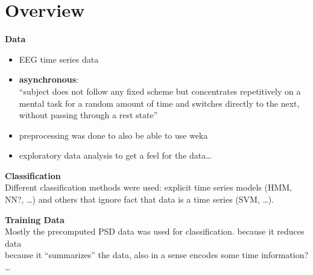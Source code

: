 
\section{Overview}

\textbf{Data}
\begin{itemize}
    \item EEG time series data
    \item \textbf{asynchronous}:\\
        ``subject does not follow any fixed scheme but concentrates repetitively on a mental task for a random amount of time
        and switches directly to the next, without passing through a rest state''
    \item preprocessing was done to also be able to use weka
    \item exploratory data analysis to get a feel for the data\ldots
\end{itemize}

\textbf{Classification}\\
Different classification methods were used: explicit time series models (HMM, NN?, \ldots) and others that ignore fact that data is a time series (SVM, \ldots).

\textbf{Training Data}\\
Mostly the precomputed PSD data was used for classification.
\arr because it reduces data\\
\arr because it ``summarizes'' the data, also in a sense encodes some time information?
\arr \ldots

